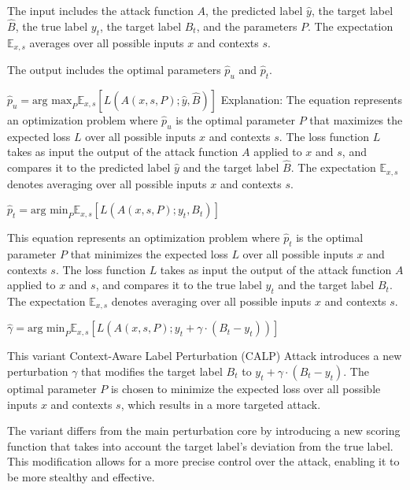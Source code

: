 The input includes the attack function $A$, the predicted label $\hat{y}$, the target label $\hat{B}$, the true label $y_t$, the target label $B_t$, and the parameters $P$. The expectation $\mathbb{E}_{x,s}$ averages over all possible inputs $x$ and contexts $s$.

The output includes the optimal parameters $\hat{p}_u$ and $\hat{p}_t$.

$\hat{p}_u = \text{arg max}_P \mathbb{E}_{x,s}[L(A(x, s, P); \hat{y}, \hat{B})]$
Explanation: The equation represents an optimization problem where $\hat{p}_u$ is the optimal parameter $P$ that maximizes the expected loss $L$ over all possible inputs $x$ and contexts $s$. The loss function $L$ takes as input the output of the attack function $A$ applied to $x$ and $s$, and compares it to the predicted label $\hat{y}$ and the target label $\hat{B}$. The expectation $\mathbb{E}_{x,s}$ denotes averaging over all possible inputs $x$ and contexts $s$.

$\hat{p}_t = \text{arg min}_P \mathbb{E}_{x,s}[L(A(x, s, P); y_t, B_t)]$

This equation represents an optimization problem where $\hat{p}_t$ is the optimal parameter $P$ that minimizes the expected loss $L$ over all possible inputs $x$ and contexts $s$. The loss function $L$ takes as input the output of the attack function $A$ applied to $x$ and $s$, and compares it to the true label $y_t$ and the target label $B_t$. The expectation $\mathbb{E}_{x,s}$ denotes averaging over all possible inputs $x$ and contexts $s$.

$\hat{\gamma} = \text{arg min}_P \mathbb{E}_{x,s}[L(A(x, s, P); y_t + \gamma \cdot (B_t - y_t))]$

This variant Context-Aware Label Perturbation (CALP) Attack introduces a new perturbation $\gamma$ that modifies the target label $B_t$ to $y_t + \gamma \cdot (B_t - y_t)$. The optimal parameter $P$ is chosen to minimize the expected loss over all possible inputs $x$ and contexts $s$, which results in a more targeted attack.

The variant differs from the main perturbation core by introducing a new scoring function that takes into account the target label's deviation from the true label. This modification allows for a more precise control over the attack, enabling it to be more stealthy and effective.